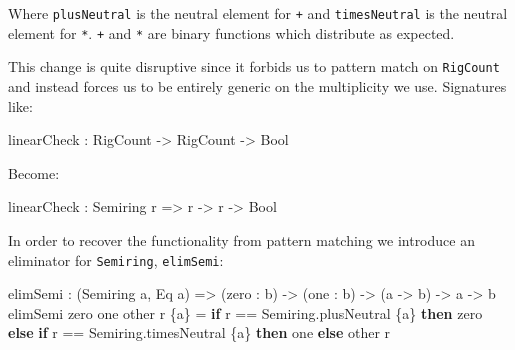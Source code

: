 \documentclass[
]{article}
\newenvironment{Shaded}{}{}
\newcommand{\DataTypeTok}[1]{\textcolor[rgb]{0.56,0.13,0.00}{#1}}
\newcommand{\KeywordTok}[1]{\textcolor[rgb]{0.00,0.44,0.13}{\textbf{#1}}}
\newcommand{\NormalTok}[1]{#1}
\newcommand{\OperatorTok}[1]{\textcolor[rgb]{0.40,0.40,0.40}{#1}}
\newcommand{\OtherTok}[1]{\textcolor[rgb]{0.00,0.44,0.13}{#1}}
\begin{document}
Where \texttt{plusNeutral} is the neutral element for
\texttt{\textbar{}+\textbar{}} and \texttt{timesNeutral} is the neutral
element for \texttt{\textbar{}*\textbar{}}.
\texttt{\textbar{}+\textbar{}} and \texttt{\textbar{}*\textbar{}} are
binary functions which distribute as expected.

This change is quite disruptive since it forbids us to pattern match on
\texttt{RigCount} and instead forces us to be entirely generic on the
multiplicity we use. Signatures like:

\begin{Shaded}
\begin{Highlighting}[]
\NormalTok{linearCheck }\OperatorTok{:} \DataTypeTok{RigCount} \OtherTok{{-}\textgreater{}} \DataTypeTok{RigCount} \OtherTok{{-}\textgreater{}} \DataTypeTok{Bool}
\end{Highlighting}
\end{Shaded}

Become:

\begin{Shaded}
\begin{Highlighting}[]
\NormalTok{linearCheck }\OperatorTok{:} \DataTypeTok{Semiring}\NormalTok{ r }\OtherTok{=\textgreater{}}\NormalTok{ r }\OtherTok{{-}\textgreater{}}\NormalTok{ r }\OtherTok{{-}\textgreater{}} \DataTypeTok{Bool}
\end{Highlighting}
\end{Shaded}

In order to recover the functionality from pattern matching we introduce
an eliminator for \texttt{Semiring}, \texttt{elimSemi}:

\begin{Shaded}
\begin{Highlighting}[]
\NormalTok{elimSemi }\OperatorTok{:}\NormalTok{ (}\DataTypeTok{Semiring}\NormalTok{ a, }\DataTypeTok{Eq}\NormalTok{ a) }\OtherTok{=\textgreater{}}\NormalTok{ (zero }\OperatorTok{:}\NormalTok{ b) }\OtherTok{{-}\textgreater{}}\NormalTok{ (one }\OperatorTok{:}\NormalTok{ b) }\OtherTok{{-}\textgreater{}}\NormalTok{ (a }\OtherTok{{-}\textgreater{}}\NormalTok{ b) }
       \OtherTok{{-}\textgreater{}}\NormalTok{ a }\OtherTok{{-}\textgreater{}}\NormalTok{ b}
\NormalTok{elimSemi zero one other r \{a\} }\OtherTok{=}
  \KeywordTok{if}\NormalTok{ r }\OperatorTok{==}\NormalTok{ Semiring.plusNeutral \{a\}}
     \KeywordTok{then}\NormalTok{ zero}
     \KeywordTok{else} \KeywordTok{if}\NormalTok{ r }\OperatorTok{==}\NormalTok{ Semiring.timesNeutral \{a\}}
             \KeywordTok{then}\NormalTok{ one}
             \KeywordTok{else}\NormalTok{ other r}
\end{Highlighting}
\end{Shaded}
\end{document}
